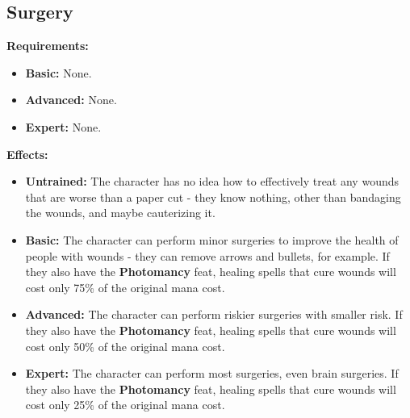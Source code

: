 \subsection{Surgery}
\textbf{Requirements:}
\begin{itemize}
	\item \textbf{Basic:} None.
	\item \textbf{Advanced:} None.
	\item \textbf{Expert:} None.
\end{itemize}
\textbf{Effects:}
\begin{itemize}
	\item \textbf{Untrained:} The character has no idea how to effectively treat any wounds that are worse than a paper cut - they know nothing, other than bandaging the wounds, and maybe cauterizing it.
	\item \textbf{Basic:} The character can perform minor surgeries to improve the health of people with wounds - they can remove arrows and bullets, for example. If they also have the \textbf{Photomancy} feat, healing spells that cure wounds will cost only 75\% of the original mana cost.
	\item \textbf{Advanced:} The character can perform riskier surgeries with smaller risk. If they also have the \textbf{Photomancy} feat, healing spells that cure wounds will cost only 50\% of the original mana cost.
	\item \textbf{Expert:} The character can perform most surgeries, even brain surgeries. If they also have the \textbf{Photomancy} feat, healing spells that cure wounds will cost only 25\% of the original mana cost.
\end{itemize}\newpage
